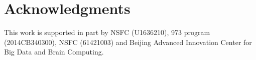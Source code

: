 \documentclass[twocolumn]{svjour3}          %
\begin{document}









\section*{Acknowledgments}
This work is supported in part by NSFC (U1636210), 973 program ({2014CB340300}), NSFC ({61421003}) and  Beijing Advanced Innovation Center for Big Data and Brain Computing.

\balance




%

\end{document}
